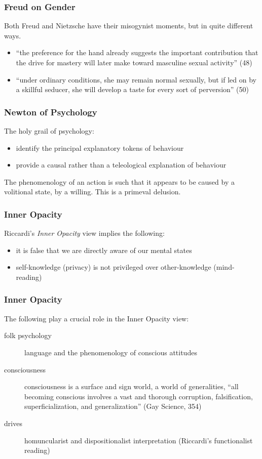\documentclass[xcolor=dvipsnames]{beamer}
\begin{document}
\begin{frame}
  \frametitle{Freud on Gender}
  Both Freud and Nietzsche have their misogynist moments, but in quite
  different ways. 
  \begin{itemize}
  \item ``the preference for the hand already suggests the important
    contribution that the drive for mastery will later make toward
    masculine sexual activity'' (48)
  \item ``under ordinary conditions, she may remain normal sexually,
    but if led on by a skillful seducer, she will develop a taste for
    every sort of perversion'' (50)
  \end{itemize}
\end{frame}

\begin{frame}
  \frametitle{Newton of Psychology}
  The holy grail of psychology:
  \begin{itemize}
  \item identify the principal explanatory tokens of behaviour
  \item provide a causal rather than a teleological explanation of behaviour
  \end{itemize}
The phenomenology of an action is such that it appears to be caused
by a volitional state, by a willing. This is a primeval delusion.
\end{frame}

\begin{frame}
  \frametitle{Inner Opacity}
  Riccardi's \emph{Inner Opacity} view implies the following:
  \begin{itemize}
  \item it is false that we are directly aware of our mental states
  \item self-knowledge (privacy) is not privileged over
    other-knowledge (mind-reading)
  \end{itemize}
\end{frame}

\begin{frame}
  \frametitle{Inner Opacity}
  The following play a crucial role in the Inner Opacity view:
  \begin{description}
  \item[folk psychology] language and the phenomenology of conscious
    attitudes
  \item[consciousness] consciousness is a surface and sign world, a
    world of generalities, ``all becoming conscious involves a vast
    and thorough corruption, falsification, superficialization, and
    generalization'' (Gay Science, 354)
  \item[drives] homuncularist and dispositionalist interpretation
    (Riccardi's functionalist reading)
  \end{description}
\end{frame}
\end{document}
